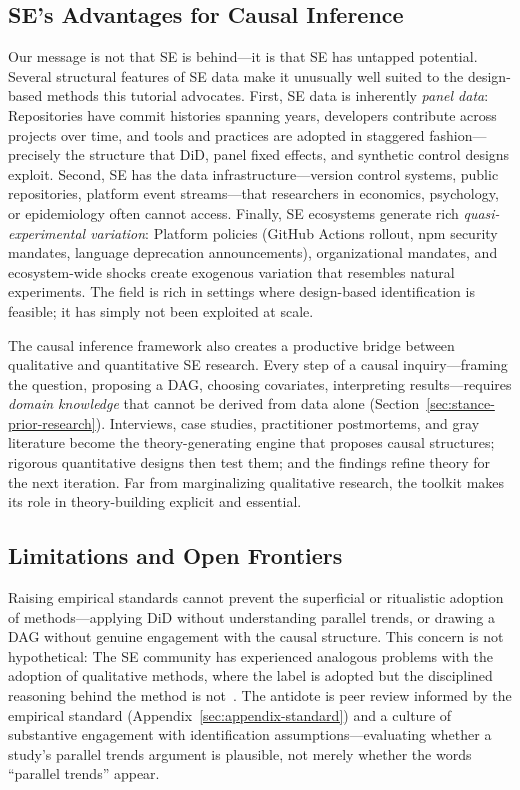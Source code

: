 \subsection{SE's Advantages for Causal Inference}

Our message is not that SE is behind---it is that SE has untapped potential.
Several structural features of SE data make it unusually well suited to the design-based methods this tutorial advocates.
First, SE data is inherently \emph{panel data}: Repositories have commit histories spanning years, developers contribute across projects over time, and tools and practices are adopted in staggered fashion---precisely the structure that DiD, panel fixed effects, and synthetic control designs exploit.
Second, SE has the data infrastructure---version control systems, public repositories, platform event streams---that researchers in economics, psychology, or epidemiology often cannot access.
Finally, SE ecosystems generate rich \emph{quasi-experimental variation}: Platform policies (GitHub Actions rollout, npm security mandates, language deprecation announcements), organizational mandates, and ecosystem-wide shocks create exogenous variation that resembles natural experiments.
The field is rich in settings where design-based identification is feasible; it has simply not been exploited at scale.

The causal inference framework also creates a productive bridge between qualitative and quantitative SE research.
Every step of a causal inquiry---framing the question, proposing a DAG, choosing covariates, interpreting results---requires \emph{domain knowledge} that cannot be derived from data alone (Section~\ref{sec:stance-prior-research}).
Interviews, case studies, practitioner postmortems, and gray literature become the theory-generating engine that proposes causal structures; rigorous quantitative designs then test them; and the findings refine theory for the next iteration.
Far from marginalizing qualitative research, the toolkit makes its role in theory-building explicit and essential.

\subsection{Limitations and Open Frontiers}

Raising empirical standards cannot prevent the superficial or ritualistic adoption of methods---applying DiD without understanding parallel trends, or drawing a DAG without genuine engagement with the causal structure.
This concern is not hypothetical: The SE community has experienced analogous problems with the adoption of qualitative methods, where the label is adopted but the disciplined reasoning behind the method is not~\cite{DBLP:journals/tosem/RobillardAEGLNNSSS24}.
The antidote is peer review informed by the empirical standard (Appendix~\ref{sec:appendix-standard}) and a culture of substantive engagement with identification assumptions---evaluating whether a study's parallel trends argument is plausible, not merely whether the words ``parallel trends'' appear.

